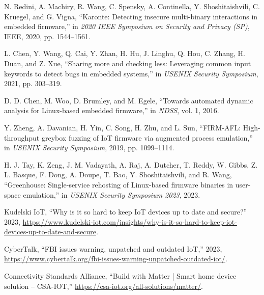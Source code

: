 %


N. Redini, A. Machiry, R. Wang, C. Spensky, A. Continella, Y. Shoshitaishvili, C. Kruegel, and G. Vigna, ``Karonte: Detecting insecure multi-binary interactions in embedded firmware,'' in \textit{2020 IEEE Symposium on Security and Privacy (SP)}, IEEE, 2020, pp. 1544--1561.

L. Chen, Y. Wang, Q. Cai, Y. Zhan, H. Hu, J. Linghu, Q. Hou, C. Zhang, H. Duan, and Z. Xue, ``Sharing more and checking less: Leveraging common input keywords to detect bugs in embedded systems,'' in \textit{USENIX Security Symposium}, 2021, pp. 303--319.

D. D. Chen, M. Woo, D. Brumley, and M. Egele, ``Towards automated dynamic analysis for Linux-based embedded firmware,'' in \textit{NDSS}, vol. 1, 2016.

Y. Zheng, A. Davanian, H. Yin, C. Song, H. Zhu, and L. Sun, ``FIRM-AFL: High-throughput greybox fuzzing of IoT firmware via augmented process emulation,'' in \textit{USENIX Security Symposium}, 2019, pp. 1099--1114.

H. J. Tay, K. Zeng, J. M. Vadayath, A. Raj, A. Dutcher, T. Reddy, W. Gibbs, Z. L. Basque, F. Dong, A. Doupe, T. Bao, Y. Shoshitaishvili, and R. Wang, ``Greenhouse: Single-service rehosting of Linux-based firmware binaries in user-space emulation,'' in \textit{USENIX Security Symposium 2023}, 2023.


{Kudelski IoT}, ``Why is it so hard to keep IoT devices up to date and secure?'' 2023, \url{https://www.kudelski-iot.com/insights/why-is-it-so-hard-to-keep-iot-devices-up-to-date-and-secure}.

{CyberTalk}, ``FBI issues warning, unpatched and outdated IoT,'' 2023, \url{https://www.cybertalk.org/fbi-issues-warning-unpatched-outdated-iot/}.

{Connectivity Standards Alliance}, ``Build with Matter | Smart home device solution -- CSA-IOT,'' \url{https://csa-iot.org/all-solutions/matter/}.

